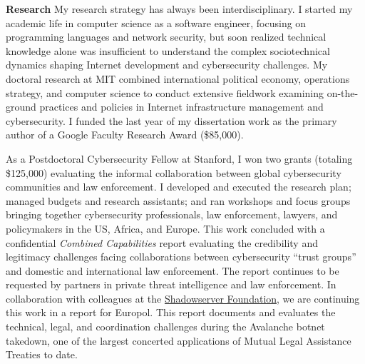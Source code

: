 \documentclass[11pt]{letter}
\begin{document}
\begin{letter}
\textbf{Research} \vspace{0.2 \baselineskip} \newline %
%
My research strategy has always been interdisciplinary. 
%
I started my academic life in computer science as a software engineer, focusing on programming languages and network security, but soon realized technical knowledge alone was insufficient to understand the complex sociotechnical dynamics shaping Internet development and cybersecurity challenges.
My doctoral research at MIT combined international political economy, operations strategy, and computer science to conduct extensive fieldwork examining on-the-ground practices and policies in Internet infrastructure management and cybersecurity.
%
I funded the last year of my dissertation work as the primary author of a Google Faculty Research Award (\$85,000). 
%

As a Postdoctoral Cybersecurity Fellow at Stanford, I won two grants (totaling \$125,000) evaluating the informal collaboration between global  cybersecurity communities and law enforcement.
%
%
I developed and executed the research plan; managed budgets and research assistants; and ran workshops and focus groups bringing together cybersecurity professionals, law enforcement, lawyers, and policymakers in the US, Africa, and Europe.
%
This work concluded with a confidential \emph{Combined Capabilities} report evaluating the credibility and legitimacy challenges facing collaborations between cybersecurity ``trust groups'' and domestic and international law enforcement.
%
The report continues to be requested by partners in private threat intelligence and law enforcement.
%
%
In collaboration with colleagues at the \href{https://www.shadowserver.org/}{Shadowserver Foundation}, we are continuing this work in a report for Europol.
%
This report documents and evaluates the technical, legal, and coordination challenges during the Avalanche botnet takedown, one of the largest concerted applications of Mutual Legal Assistance Treaties to date.



\end{letter}
\end{document}
